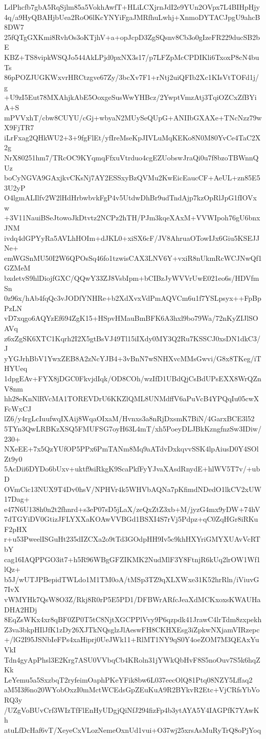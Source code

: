 LdPhcfb7gbA5RqSjlm85a5VokhAwfT+HLiLCXjrnJdI2e9YUn2OVpx7L4BIHpHjy
4q/a9HyQBAHjbUea2RoO6lKcYNYiFgaJMRfhuLwhj+XnmoDYTACJpgU9ahcB8DW7
25fQTgGXKmi8RvhOs3oKTjhV+a+opJcpD3ZgSQsnv8Cb3o0gIzeFR229ducSB2bE
KBZ+TS8vipkWSQJo544AkLPjd0pxNX3s17/p7LFZpMcCPDIKli6TxoxP8cN4buTs
86pPOZJUGKWxvrHRCtzgve67Zy/3bcXv7F1+rNtj2uiQFIb2Xc1KIsVtTOFd1j/g
+U9zI5Eut78MXAhjkAbE5OoxgeSusWwYHBcz/2YwptVmzAtj3TqiOZCxZfBYiA+S
mPVVxhT/cbw8CUYU/cGj+wbyaN2MUySeQUpG+ANIIbGXAXe+TNcNzz79wX9FjTR7
iLrFxag2QHkWU2+3+9fgFlEt/yfIreMseKpJIVLuMqKEKo8N0M80YvCe4TaC2X2g
NrX80251hm7/TRcOC9KYqmqFfxuVtrduo4cgEZUobswJraQi0u7f8bzoTBWnnQUz
boCyNGVA9GAxjkvCKsNj7AY2ESSxyBzQVMu2KwEicEaucCF+AeUL+zn85E53U2yP
O4lgmALIlfv2W2lHdHrbwbvkFgP4v5UtdwDhBr9udTndAjp7kzOpRlJpG1fIOVxw
+3V11NauiBSeJtowoJkDtvtz2NCPz2hTH/PJm3kqeXAxM+VVWIpoh76gU6bnxJNM
ivdq4dGPYyRa5AVLhHOIm+dJKL0+xiSX6cF/JV8AhruaOTowIJx6Giu5KSEJJNe+
emWGSnMU50I2W6QPOsSq46fo1tzwisCAX3LNV6Y+vxiR8nUkmRcWCJNwQf1GZMeM
bxdetvS9hlDiojfGXC/QQwY33ZJ8VsbIpm+bCIBzJyWVVrUwE021eo6s/HDVfmSn
0z96x/hAb4fqQc3vJODfYNHRe+b2XdXvxVdPmAQVCm6u1f7YSLpsyx++FpBpPzLN
vD7xqgo6AQYzEf694ZgK15+HSpvHMauBmBFK6A3hxl9bo79Wa/72nKyZIJlSOAVq
z6xZgSK6XTC1Kqrh2I2X5gtBsVJ49Tl15iIXdy0MY3Q2Ru7KSSCJ0xsDN1dkC3/J
yYGJrhBbV1YwxZEB8A2zNcYJB4+3vBnN7wSNHXvcMMsGwvi/G8x8TKeg/iTHYUeq
1dpgEAv+FYX8jDGC0FkvjdIqk/OD8COh/wzIfD1UBdQjCsBdUPsEXX8WrQZnV8nm
hh28eKnNlRVcMA1TOREVDrU6KKZlQML8UNMdffV6aPuVcB4YPQqIu05cwXFcWxCJ
lZ6/y4rgLcIuufwqIXAij8WqaOIxaM/Hvnxs3a8nRjDxsmK7BiN/4GarxBCE3l52
5TYn3QwLRBKzXSQ5FMUFSG7oyH63L4mT/xh5PoeyDLJBkKzngfnzSw3IDiw/230+
NXeEE+7x5QzYUfOP5PPx6PmTANm8Mq9aATdvDxkqvvSSK4lpAiusD0Y4SOlZt9y0
5AcDii6DYDo6bUxv+uktf9siRkgK9ScaPkfFyYJvaXAsdRnydE+hlWV5T7v/+ubD
OVmCic13NUX9T4Dv0hsV/NPHVr4k5WHVbAQNa7pKfimdNDedO1lkCV2xUW17Dag+
e47N6U138h0n2t2fhnrd+s3eP07sD5jLaX/zeQxZtZ3xb+M/jyzG4mx9yDW+74hV
7dTGYiDV0GtizJFLYXXaKOAwVVBGd1BSXI4S7rVj5Pdpz+qC0ZqHGr8iRKuF2pHX
r+u53PweelISGuHt235dIZCXa2o9tTd3GOdpHH9Iv5c9khHXYriGMYXUAvVcRTbY
cag16IAQPPGO3it7+h5R96WBgGFZIKMK2NudMlF3Y8FtnjR6kUq2lrOW1Wf1lQz+
b5J/wUTJPBepidTWLdo1M1TM0oA/tMSp3TZ9qXLXWxe31K52hrRln/iViuvG7IvX
vWMYHk7QsW8O3Z/Rkj8R0rP5E5PD1/DFBWrARfcJeaXdMCKxoxsKWAUHaDHA2HDj
8EqZsWKx4xr8qBF0ZP0T5tC8NjtXGCPPlVvy9P6qzpdk41JrawC4lrTdm8zxpekh
Z3va3bkpHIlJfK1zDy26XJTkNQsglzJlAeswFH8CKHXEsg3iZpkwNXjamVIRzepc
+/lG2I95JSNbIeFPs4xaHiprj0UeJWk11+RlMT1NY9qS0Y4oeZOM7M3QEAxYuVkI
Tdn4gyApPhsl3E2Krg7ASU0VVbqCb4KRoln31jYWkQbHvF8S5noOuv7S5k6hqZKk
LeYemu5a5SxzbqT2ryfeimOaphPKeYFik8bw6L037eecOlQ81Ptq08NZY5Lffaq2
aM5I3f6no20WYobOxzI0mMctWCEdsGpZEuKuA9R2BYkvR2Etc+VjCRfsYbVoRQ3y
/UZgVoBUvCrf3WIzTfFlEnHyUDgjQiNfJ294fizFp4b3ytAYA5Y4IAGPfK7YAwKh
atuLfDcHaf6vT/XeyeCxVLozNemeOxnUd1vui+O37wj25xrsAsMuRyTrQ8oPjYoq
